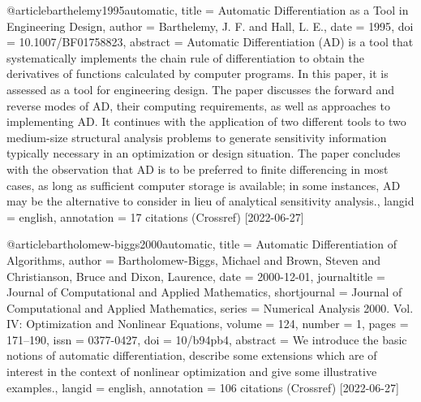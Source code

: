 @article{barthelemy1995automatic,
  title = {Automatic Differentiation as a Tool in Engineering Design},
  author = {Barthelemy, J. F. and Hall, L. E.},
  date = {1995},
  doi = {10.1007/BF01758823},
  abstract = {Automatic Differentiation (AD) is a tool that systematically implements the chain rule of differentiation to obtain the derivatives of functions calculated by computer programs. In this paper, it is assessed as a tool for engineering design. The paper discusses the forward and reverse modes of AD, their computing requirements, as well as approaches to implementing AD. It continues with the application of two different tools to two medium-size structural analysis problems to generate sensitivity information typically necessary in an optimization or design situation. The paper concludes with the observation that AD is to be preferred to finite differencing in most cases, as long as sufficient computer storage is available; in some instances, AD may be the alternative to consider in lieu of analytical sensitivity analysis.},
  langid = {english},
  annotation = {17 citations (Crossref) [2022-06-27]}
}

@article{bartholomew-biggs2000automatic,
  title = {Automatic Differentiation of Algorithms},
  author = {Bartholomew-Biggs, Michael and Brown, Steven and Christianson, Bruce and Dixon, Laurence},
  date = {2000-12-01},
  journaltitle = {Journal of Computational and Applied Mathematics},
  shortjournal = {Journal of Computational and Applied Mathematics},
  series = {Numerical {{Analysis}} 2000. {{Vol}}. {{IV}}: {{Optimization}} and {{Nonlinear Equations}}},
  volume = {124},
  number = {1},
  pages = {171--190},
  issn = {0377-0427},
  doi = {10/b94pb4},
  abstract = {We introduce the basic notions of automatic differentiation, describe some extensions which are of interest in the context of nonlinear optimization and give some illustrative examples.},
  langid = {english},
  annotation = {106 citations (Crossref) [2022-06-27]}
}

